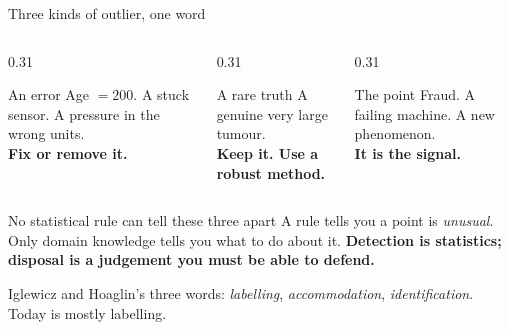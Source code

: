 \documentclass[aspectratio=169]{beamer}
\begin{document}
\begin{frame}[shrink=6]{Three kinds of outlier, one word}
  \begin{columns}[T]
    \begin{column}{0.31\textwidth}
      \begin{block}{An error}
        Age $= 200$. A stuck sensor. A pressure in the wrong units.\\[0.3em]
        \textbf{Fix or remove it.}
      \end{block}
    \end{column}
    \begin{column}{0.31\textwidth}
      \begin{block}{A rare truth}
        A genuine very large tumour. \\[0.3em]
        \textbf{Keep it. Use a robust method.}
      \end{block}
    \end{column}
    \begin{column}{0.31\textwidth}
      \begin{exampleblock}{The point}
        Fraud. A failing machine. A new phenomenon.\\[0.3em]
        \textbf{It is the signal.}
      \end{exampleblock}
    \end{column}
  \end{columns}
  \vspace{0.5em}
  \begin{alertblock}{No statistical rule can tell these three apart}
    A rule tells you a point is \emph{unusual}. Only domain knowledge tells you
    what to do about it. \textbf{Detection is statistics; disposal is a
    judgement you must be able to defend.}
  \end{alertblock}
  \vspace{0.2em}
  \begin{center}\small
    Iglewicz and Hoaglin's three words: \emph{labelling}, \emph{accommodation},
    \emph{identification}. Today is mostly labelling.
  \end{center}
\end{frame}
\end{document}
